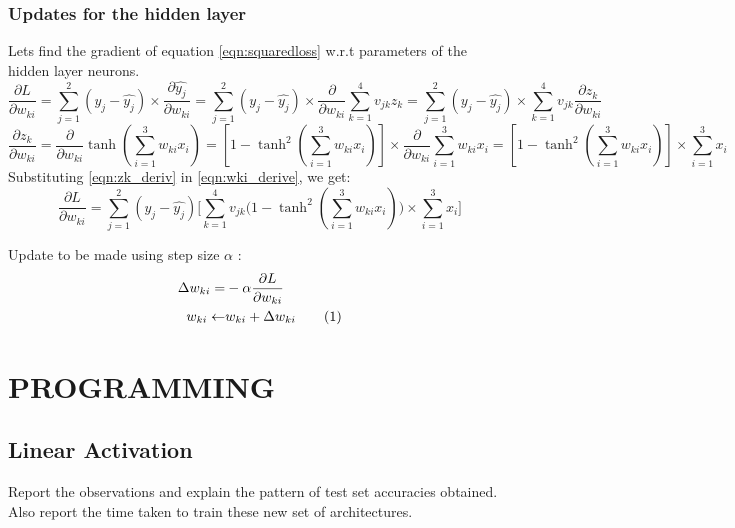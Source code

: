 \documentclass[a4paper,doc,notimes]{article}
\newcommand\numberthis{\addtocounter{equation}{1}\tag{\theequation}}
\begin{document}
\subsubsection{Updates for the hidden layer}
Lets find the gradient of equation \ref{eqn:squaredloss} w.r.t parameters of the hidden layer neurons.
\begin{equation}\label{eqn:wki_derive}
\frac{\partial L}{\partial w_{ki}} = \sum_{j=1}^{2}(y_j - \hat{y_j}) \times \frac{\partial \hat{y_j}}{\partial w_{ki}} = \sum_{j=1}^{2}(y_j - \hat{y_j}) \times \frac{\partial }{\partial w_{ki}} \sum_{k=1}^{4} v_{jk}z_k  = \sum_{j=1}^{2}(y_j - \hat{y_j}) \times \sum_{k=1}^{4} v_{jk}  \frac{\partial z_k}{\partial w_{ki}} 
\end{equation}
\begin{equation} \label{eqn:zk_deriv}
\frac{\partial z_k}{\partial w_{ki}} = \frac{\partial }{\partial w_{ki}}  \tanh(\sum_{i=1}^{3} w_{ki}x_i) = [ 1 - \tanh^2(\sum_{i=1}^{3} w_{ki}x_i)] \times  \frac{\partial }{\partial w_{ki}} \sum_{i=1}^{3} w_{ki}x_i = [ 1 - \tanh^2(\sum_{i=1}^{3} w_{ki}x_i)] \times   \sum_{i=1}^{3} x_i  
\end{equation}
Substituting \ref{eqn:zk_deriv} in \ref{eqn:wki_derive}, we get: 
\begin{equation}\label{eqn:wki_derive2}
\frac{\partial L}{\partial w_{ki}} = \sum_{j=1}^{2}(y_j - \hat{y_j}) \bigg[ \sum_{k=1}^{4} v_{jk} \big( 1 - \tanh^2(\sum_{i=1}^{3} w_{ki}x_i) \big)\times   \sum_{i=1}^{3} x_i  \bigg]
\end{equation}

Update to be made using step size $\alpha$ : 
\begin{align*}
\Delta w_{ki}  = & - \alpha \frac{\partial L}{\partial w_{ki}} \\
w_{ki} \leftarrow &  w_{ki}  + \Delta w_{ki} \numberthis
\end{align*}


\section{PROGRAMMING}

\subsection{Linear Activation}
Report the observations and explain the pattern of test set accuracies obtained. Also report the time taken to train these new set of architectures.
\end{document}
